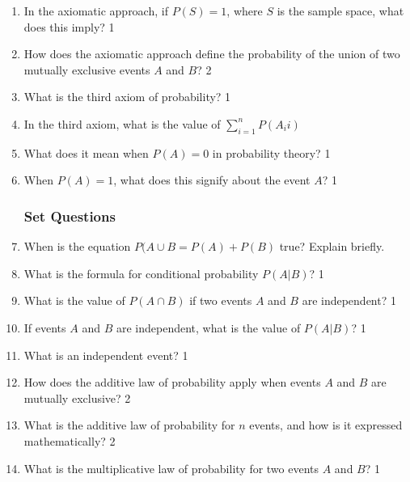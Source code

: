 \documentclass[a4paper,oneside, margin=1.4in]{book}
\begin{document}
\begin{enumerate}
\item In the axiomatic approach, if \( P(S) = 1 \), where \( S \) is the sample space, what does this imply? \hfill 1

\item How does the axiomatic approach define the probability of the union of two mutually exclusive events \( A \) and \( B \)? \hfill 2

\item What is the third axiom of probability? \hfill 1

\item In the third axiom, what is the value of $\displaystyle \sum_{i=1}^n P(A_ii)$

\item What does it mean when \( P(A) = 0 \) in probability theory? \hfill 1

\item When \( P(A) = 1 \), what does this signify about the event \( A \)? \hfill 1

\subsubsection{Set Questions}

\item When is the equation $P(A \cup B = P(A) + P(B)$ true? Explain briefly.

\item What is the formula for conditional probability \( P(A|B) \)? \hfill 1

\item What is the value of $P(A \cap B)$ if two events \( A \) and \( B \) are independent? \hfill 1

\item If events \( A \) and \( B \) are independent, what is the value of \( P(A|B) \)? \hfill 1

\item What is an independent event? \hfill 1

\item How does the additive law of probability apply when events \( A \) and \( B \) are mutually exclusive? \hfill 2

\item What is the additive law of probability for \( n \) events, and how is it expressed mathematically? \hfill 2

\item What is the multiplicative law of probability for two events \( A \) and \( B \)? \hfill 1


\end{enumerate}
\end{document}
